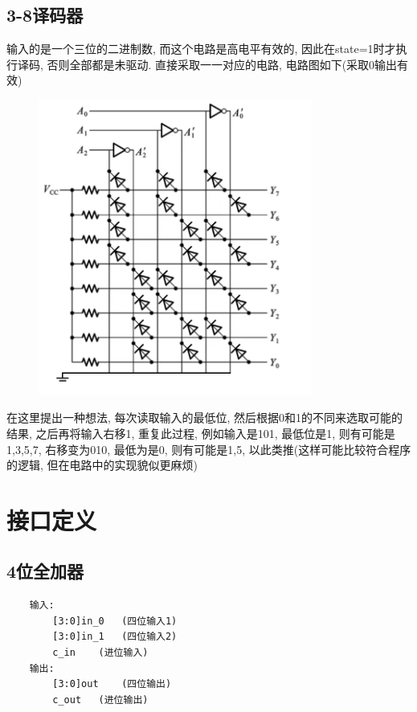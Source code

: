 \documentclass[fontset=windows,12pt]{article}
\begin{document}
    \subsection{3-8译码器}
        输入的是一个三位的二进制数, 而这个电路是高电平有效的, 因此在state=1时才执行译码, 否则全部都是未驱动. 直接采取一一对应的电路, 电路图如下(采取0输出有效)\\
        \begin{figure}[ht]
            \centering
            \includegraphics[width=0.8\textwidth]{3to8decoder.jpg}
            \label{3to8decoder}
        \end{figure}\par
        在这里提出一种想法, 每次读取输入的最低位, 然后根据0和1的不同来选取可能的结果, 之后再将输入右移1, 重复此过程, 例如输入是101, 最低位是1, 则有可能是1,3,5,7, 
        右移变为010, 最低为是0, 则有可能是1,5, 以此类推(这样可能比较符合程序的逻辑, 但在电路中的实现貌似更麻烦)
        \bigskip\bigskip\bigskip\bigskip
\section{接口定义}
    \subsection{4位全加器}
    {\setmainfont{Courier New Bold}                          %
    \begin{lstlisting}
    输入:
        [3:0]in_0   (四位输入1)
        [3:0]in_1   (四位输入2)
        c_in    (进位输入)
    输出:
        [3:0]out    (四位输出)
        c_out   (进位输出)
    \end{lstlisting}}
\end{document}
